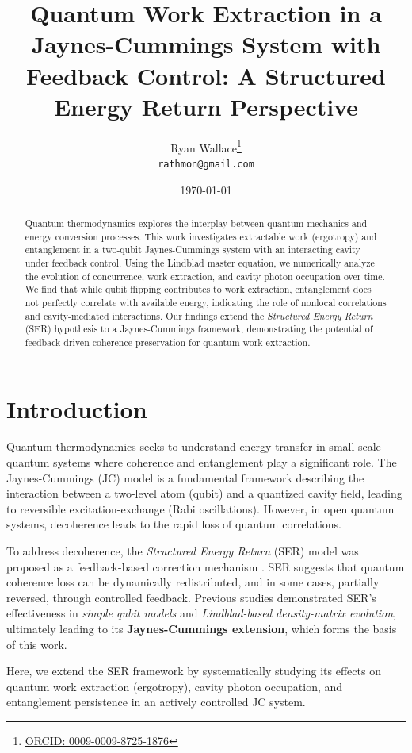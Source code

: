 \documentclass[a4paper,12pt]{article}
\title{Quantum Work Extraction in a Jaynes-Cummings System with Feedback Control: A Structured Energy Return Perspective}
\author{Ryan Wallace\thanks{\href{https://orcid.org/0009-0009-8725-1876}{ORCID: 0009-0009-8725-1876}} \\ 
\texttt{rathmon@gmail.com}}
\date{\today}
\begin{document}
\maketitle

\begin{abstract}
Quantum thermodynamics explores the interplay between quantum mechanics and energy conversion processes. 
This work investigates extractable work (ergotropy) and entanglement in a two-qubit Jaynes-Cummings system 
with an interacting cavity under feedback control. Using the Lindblad master equation, we numerically analyze 
the evolution of concurrence, work extraction, and cavity photon occupation over time. We find that while qubit 
flipping contributes to work extraction, entanglement does not perfectly correlate with available energy, indicating 
the role of nonlocal correlations and cavity-mediated interactions. Our findings extend the \textit{Structured Energy 
Return} (SER) hypothesis to a Jaynes-Cummings framework, demonstrating the potential of feedback-driven coherence 
preservation for quantum work extraction.
\end{abstract}

\section{Introduction}
Quantum thermodynamics seeks to understand energy transfer in small-scale quantum systems where coherence and entanglement 
play a significant role. The Jaynes-Cummings (JC) model \cite{jaynes1963comparison} is a fundamental framework describing 
the interaction between a two-level atom (qubit) and a quantized cavity field, leading to reversible excitation-exchange 
(Rabi oscillations). However, in open quantum systems, decoherence leads to the rapid loss of quantum correlations.

To address decoherence, the \textit{Structured Energy Return} (SER) model was proposed as a feedback-based correction mechanism \cite{wallace2025ser}. SER suggests that quantum coherence loss can be dynamically redistributed, and in some cases, partially reversed, through controlled feedback. Previous studies demonstrated SER’s effectiveness in \textit{simple qubit models} and \textit{Lindblad-based density-matrix evolution}, ultimately leading to its \textbf{Jaynes-Cummings extension}, which forms the basis of this work.

Here, we extend the SER framework by systematically studying its effects on quantum work extraction (ergotropy), cavity photon occupation, and entanglement persistence in an actively controlled JC system.
\end{document}
